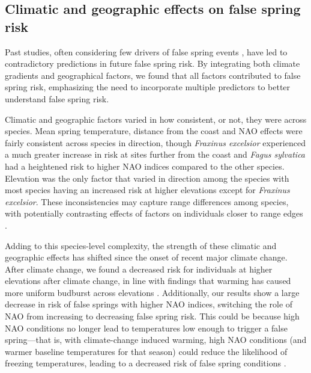 \documentclass{article}\usepackage[]{graphicx}\usepackage[]{color}
\begin{document}
\subsection*{Climatic and geographic effects on false spring risk}
Past studies, often considering few drivers of false spring events \citep{Wypych2016a,Liu2018, Ma2018, Vitasse2018}, have led to contradictory predictions in future false spring risk. By integrating both climate gradients and geographical factors, we found that all factors contributed to false spring risk, emphasizing the need to incorporate multiple predictors to better understand false spring risk. 

Climatic and geographic factors varied in how consistent, or not, they were across species. Mean spring temperature, distance from the coast and NAO effects were fairly consistent across species in direction, though \textit{Fraxinus excelsior} experienced a much greater increase in risk at sites further from the coast and \textit{Fagus sylvatica} had a heightened risk to higher NAO indices compared to the other species. Elevation was the only factor that varied in direction among the species with most species having an increased risk at higher elevations except for \textit{Fraxinus excelsior}. These inconsistencies may capture range differences among species, with potentially contrasting effects of factors on individuals closer to range edges \citep{Chuine2008}. 

Adding to this species-level complexity, the strength of these climatic and geographic effects has shifted since the onset of recent major climate change. After climate change, we found a decreased risk for individuals at higher elevations after climate change, in line with findings that warming has caused more uniform budburst across elevations \citep{Vitasse2018}. Additionally, our results show a large decrease in risk of false springs with higher NAO indices, switching the role of NAO from increasing to decreasing false spring risk. This could be because high NAO conditions no longer lead to temperatures low enough to trigger a false spring---that is, with climate-change induced warming, high NAO conditions (and warmer baseline temperatures for that season) could reduce the likelihood of freezing temperatures, leading to a decreased risk of false spring conditions \citep{Screen2017}. 
\end{document}
